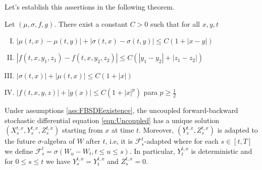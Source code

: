 Let's establish this assertions in the following theorem. 


\begin{assumptions}
	\label{ass:FBSDEexistence}
	Let $(\mu,\sigma,f,g)$. There exist a constant $C>0$ such that for all $x,y,t$
	\begin{enumerate}[I.]
		\item $|\mu(t,x)-\mu(t,y)|+|\sigma(t,x)-\sigma(t,y)|\leq C(1+|x-y|)$
		\item $|f(t,x,y_1,z_1)-f(t,x,y_2,z_2)|\leq C(|y_1-y_2|+|z_1-z_2|)$
		\item $|\sigma(t,x)|+|\mu(t,x)|\leq C(1+|x|)$
		\item $|f(t,x,y,z)|+|g(x)|\leq C(1+|x|^p)$ para $p\geq\frac{1}{2}$
	\end{enumerate}
\end{assumptions}
\newpage
\begin{theorem}
	Under assumptions \ref{ass:FBSDEexistence}, the uncoupled forward-backward stochastic differential equation \eqref{eqn:Uncoupled} has a unique solution $(X_{s}^{t,x},Y_{s}^{t,x},Z_{s}^{t,x})$ starting from $x$ at time $t$. Moreover, $(Y_{s}^{t,x},Z_{s}^{t,x})$ is adapted to the future $\sigma$-algebra of $W$ after $t$, i.e, it is $\mathcal{F}_{s}^{t}$-adapted where for each $s\in[t,T]$ we define $\mathcal{F}_{s}^{t}=\sigma(W_u-W_t,t\leq u\leq s)$. In particular, $Y_{t}^{t,x}$ is deterministic and for $0\leq s\leq t$ we have $Y_{s}^{t,x}=Y_{t}^{t,x}$ and $Z_{s}^{t,x}=0$.
\end{theorem}
